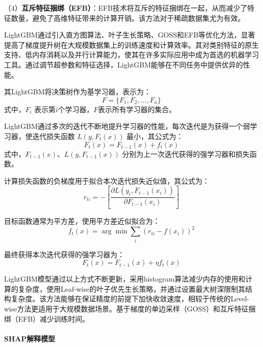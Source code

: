 \documentclass[12pt,a4paper]{article}
\begin{document}
    （4）\textbf{互斥特征捆绑（EFB）}：EFB技术将互斥的特征捆绑在一起，从而减少了特征数量，避免了高维特征带来的计算开销。该方法对于稀疏数据集尤为有效。

LightGBM通过引入直方图算法、叶子生长策略、GOSS和EFB等优化方法，显著提高了梯度提升树在大规模数据集上的训练速度和计算效率。其对类别特征的原生支持、低内存消耗以及并行计算能力，使其在许多实际应用中成为首选的机器学习工具。通过调节超参数和特征选择，LightGBM能够在不同任务中提供优异的性能。

其LightGBM将决策树作为基学习器，表示为：
\begin{equation}
F = \{F_1, F_2, \ldots, F_n\}
\end{equation}
式中，$F_i$ 表示第$i$个学习器，$F$表示所有学习器的集合。

LightGBM通过多次的迭代不断地提升学习器的性能，每次迭代是为获得一个弱学习器，使迭代损失函数 $L(y, F_t(x))$ 最小，其公式为：
\begin{equation}
F_t(x) = F_{t-1}(x) + f_t(x)
\end{equation}
式中，$F_{t-1}(x)$、$L(y,F_{t-1}(x))$ 分别为上一次迭代获得的强学习器和损失函数。

计算损失函数的负梯度用于拟合本次迭代损失近似值，其公式为：
\begin{equation}
r_{ti} = -\left[\frac{\partial L(y_i,F_{t-1}(x_i))}{\partial F_{t-1}(x_i)}\right]
\end{equation}

目标函数通常为平方差，使用平方差近似拟合为：
\begin{equation}
f_t(x) = \arg\min \sum_i(r_{ti} - f(x_i))^2
\end{equation}

最终获得本次迭代获得的强学习器为：
\begin{equation}
F_t(x) = F_{t-1}(x) + \eta f_t(x)
\end{equation}

LightGBM模型通过以上方式不断更新，采用histogram算法减少内存的使用和计算的复杂度，使用Leaf-wise的叶子优先生长策略，并通过设置最大树深限制其结构复杂度。该方法能够在保证精度的前提下加快收敛速度，相较于传统的Level-wise方法更适用于大规模数据场景。基于梯度的单边采样（GOSS）和互斥特征捆绑（EFB）减少训练时间。

\paragraph{\textbf{SHAP解释模型}}
\end{document}
